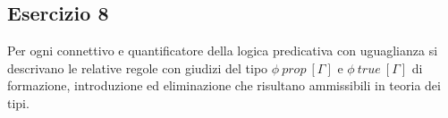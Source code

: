 \subsection{Esercizio 8}
\begin{thm}
	Per ogni connettivo e quantificatore della logica predicativa con uguaglianza si descrivano le relative regole con giudizi del tipo $\phi~prop~[\Gamma]$ e $\phi~true~[\Gamma]$ di formazione, introduzione ed eliminazione che risultano ammissibili in teoria dei tipi.
\end{thm}

